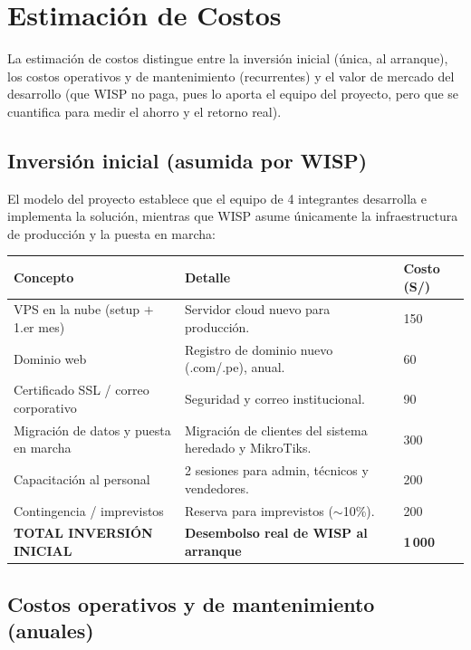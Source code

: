 \section{Estimación de Costos}
\label{sec:costos}

La estimación de costos distingue entre la inversión inicial (única, al arranque),
los costos operativos y de mantenimiento (recurrentes) y el valor de mercado del
desarrollo (que WISP no paga, pues lo aporta el equipo del proyecto, pero que se
cuantifica para medir el ahorro y el retorno real).

\subsection{Inversión inicial (asumida por WISP)}

El modelo del proyecto establece que el equipo de 4 integrantes desarrolla e
implementa la solución, mientras que WISP asume únicamente la infraestructura de
producción y la puesta en marcha:

\begin{center}
\label{tab:inversion}
\begin{tabularx}{\textwidth}{L{4.2cm} X R{1.8cm}}
\toprule
\textbf{Concepto} & \textbf{Detalle} & \textbf{Costo (S/)} \\
\midrule
VPS en la nube (setup $+$ 1.er mes) & Servidor cloud nuevo para producción. & 150 \\
Dominio web & Registro de dominio nuevo (.com/.pe), anual. & 60 \\
Certificado SSL / correo corporativo & Seguridad y correo institucional. & 90 \\
Migración de datos y puesta en marcha & Migración de clientes del sistema heredado
y MikroTiks. & 300 \\
Capacitación al personal & 2 sesiones para admin, técnicos y vendedores. & 200 \\
Contingencia / imprevistos & Reserva para imprevistos ($\sim$10\%). & 200 \\
\midrule
\textbf{TOTAL INVERSIÓN INICIAL} & \textbf{Desembolso real de WISP al arranque} & \textbf{1\,000} \\
\bottomrule
\end{tabularx}
\end{center}

\subsection{Costos operativos y de mantenimiento (anuales)}

